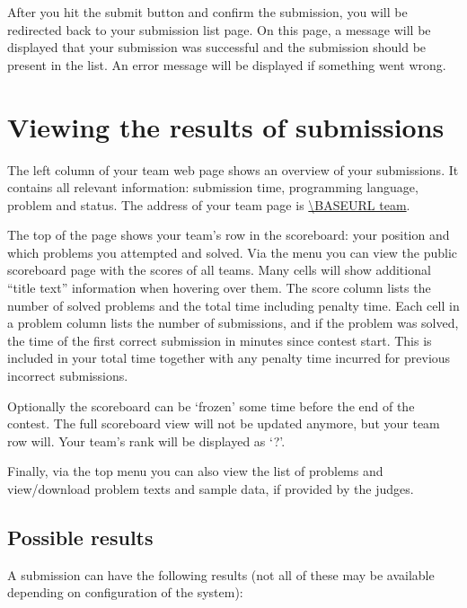 After you hit the submit button and confirm the submission, you will
be redirected back to your submission list page. On this page, a message
will be displayed that your submission was successful and the
submission should be present in the list. An error message will be
displayed if something went wrong.

\section{Viewing the results of submissions}

The left column of your team web page shows an overview of your submissions.
It contains all relevant information: submission time, programming
language, problem and status. The address of your team page is
\url{\BASEURL team}.

The top of the page shows your team's row in the scoreboard: your position and
which problems you attempted and solved. Via the menu you can view the public
scoreboard page with the scores of all teams. Many cells will show
additional ``title text'' information when hovering over them. The
score column lists the number of solved problems and the total time including
penalty time. Each cell in a problem column lists the number of submissions,
and if the problem was solved, the time of the first correct
submission in minutes since contest start. This is included in your
total time together with any penalty time incurred for previous
incorrect submissions.

Optionally the scoreboard can
be `frozen' some time before the end of the contest. The full scoreboard view
will not be updated anymore, but your team row will. Your team's rank will
be displayed as `?'.

Finally, via the top menu you can also view the
list of problems and view/download problem texts and sample data, if
provided by the judges.

\subsection{Possible results}

A submission can have the following results (not all of these may be
available depending on configuration of the system):

